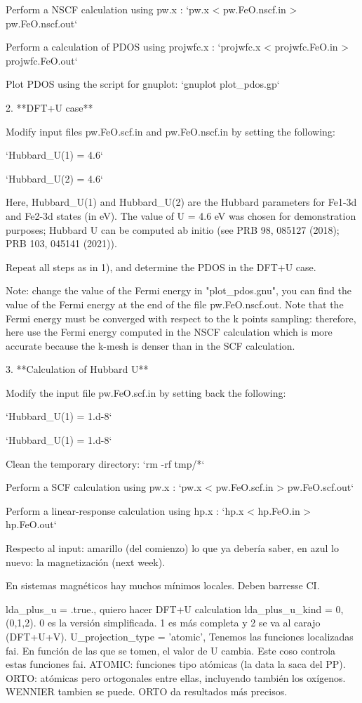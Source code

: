    Perform a NSCF calculation using pw.x :         `pw.x < pw.FeO.nscf.in > pw.FeO.nscf.out`

   Perform a calculation of PDOS using projwfc.x : `projwfc.x < projwfc.FeO.in > projwfc.FeO.out`

   Plot PDOS using the script for gnuplot:         `gnuplot plot_pdos.gp`

2. **DFT+U case**

   Modify input files pw.FeO.scf.in and pw.FeO.nscf.in by setting the
   following:

   `Hubbard_U(1) = 4.6`

   `Hubbard_U(2) = 4.6`

   Here, Hubbard_U(1) and Hubbard_U(2) are the Hubbard parameters
   for Fe1-3d and Fe2-3d states (in eV).
   The value of U = 4.6 eV was chosen for demonstration purposes;
   Hubbard U can be computed ab initio (see PRB 98, 085127 (2018); PRB 103, 045141 (2021)).

   Repeat all steps as in 1), and determine the PDOS in the DFT+U case.

   Note: change the value of the Fermi energy in "plot_pdos.gnu",
   you can find the value of the Fermi energy at the end of the file pw.FeO.nscf.out.
   Note that the Fermi energy must be converged with respect to the k points sampling:
   therefore, here use the Fermi energy computed in the NSCF calculation which
   is more accurate because the k-mesh is denser than in the SCF calculation.

3. **Calculation of Hubbard U**

  Modify the input file pw.FeO.scf.in by setting back the following:

  `Hubbard_U(1) = 1.d-8`

  `Hubbard_U(1) = 1.d-8`

  Clean the temporary directory:                      `rm -rf tmp/*`

  Perform a SCF calculation using pw.x :              `pw.x < pw.FeO.scf.in > pw.FeO.scf.out`

  Perform a linear-response calculation using hp.x :  `hp.x < hp.FeO.in > hp.FeO.out`

  Respecto al input: amarillo (del comienzo) lo que ya debería saber, en azul lo nuevo: la magnetización (next week).

  En sistemas magnéticos hay muchos mínimos locales. Deben barresse CI.

  lda_plus_u = .true., quiero hacer DFT+U calculation
   lda_plus_u_kind = 0, (0,1,2). 0 es la versión simplificada. 1 es más completa y 2 se va al carajo (DFT+U+V).
  U_projection_type = 'atomic', Tenemos las funciones localizadas fai. En función de las que se tomen, el valor de U cambia. Este coso controla estas funciones fai. ATOMIC: funciones tipo atómicas (la data la saca del PP). ORTO: atómicas pero ortogonales entre ellas, incluyendo también los oxígenos. WENNIER tambien se puede. ORTO da resultados más precisos.

